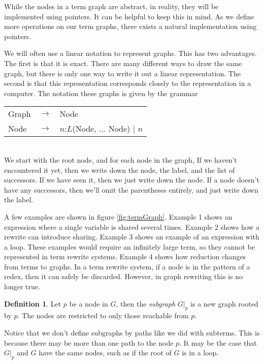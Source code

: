 \documentclass{book}
\theoremstyle{definition}
\newtheorem{definition}{Definition}[section]
\begin{document}
While the nodes in a term graph are abstract, 
in reality, they will be implemented using pointers.
It can be helpful to keep this in mind. 
As we define more operations on our term graphs, 
there exists a natural implementation using pointers.

We will often use a linear notation to represent graphs.
This has two advantages.
The first is that it is exact.
There are many different ways to draw the same graph,
but there is only one way to write it out a linear representation.
The second is that this representation corresponds closely to the representation in a computer.
The notation these graphs is given by the grammar
\begin{tabular}{lll}
    Graph & $\rightarrow$ & Node \\
    Node  & $\rightarrow$ & $n$:$L$(Node, $\ldots$ Node) $\vert$ $n$\\
\end{tabular}\\
We start with the root node, and for each node in the graph, If we haven't encountered
it yet, then we write down the node, the label, and the list of successors.
If we have seen it, then we just write down the node.
If a node doesn't have any successors, then we'll omit the parentheses entirely,
and just write down the label.

A few examples are shown in figure \ref{fig:termGraph}.
Example 1 shows an expression where a single variable is shared several times.
Example 2 shows how a rewrite can introduce sharing.
Example 3 shows an example of an expression with a loop.
These examples would require an infinitely large term, so they cannot be represented
in term rewrite systems.
Example 4 shows how reduction changes from terms to graphs.
In a term rewrite system, if a node is in the pattern of a redex, then it can safely be discarded.
However, in graph rewriting this is no longer true.

\theoremstyle{definition}
\begin{definition}
Let $p$ be a node in $G$, then the \textit{subgraph} $G\vert_p$ is a new graph rooted by $p$.
The nodes are restricted to only those reachable from $p$.
\end{definition}

Notice that we don't define subgraphs by paths like we did with subterms.
This is because there may be more than one path to the node $p$.
It may be the case that $G\vert_p$ and $G$ have the same nodes, such as if the root of $G$ is in a loop.
\end{document}
